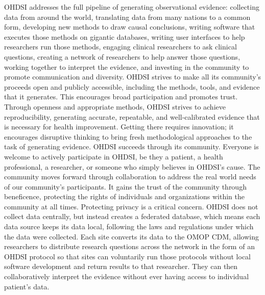 \documentclass[11pt]{book}
\theoremstyle{definition}
\theoremstyle{definition}
\theoremstyle{definition}
\theoremstyle{remark}
\begin{document}
OHDSI addresses the full pipeline of generating observational evidence: collecting data from around the world, translating data from many nations to a common form, developing new methods to draw causal conclusions, writing software that executes those methods on gigantic databases, writing user interfaces to help researchers run those methods, engaging clinical researchers to ask clinical questions, creating a network of researchers to help answer those questions, working together to interpret the evidence, and investing in the community to promote communication and diversity. OHDSI strives to make all its community's proceeds open and publicly accessible, including the methods, tools, and evidence that it generates. This encourages broad participation and promotes trust. Through openness and appropriate methods, OHDSI strives to achieve reproducibility, generating accurate, repeatable, and well-calibrated evidence that is necessary for health improvement. Getting there requires innovation; it encourages disruptive thinking to bring fresh methodological approaches to the task of generating evidence. OHDSI succeeds through its community. Everyone is welcome to actively participate in OHDSI, be they a patient, a health professional, a researcher, or someone who simply believes in OHDSI's cause. The community moves forward through collaboration to address the real world needs of our community's participants. It gains the trust of the community through beneficence, protecting the rights of individuals and organizations within the community at all times.
Protecting privacy is a critical concern. OHDSI does not collect data centrally, but instead creates a federated database, which means each data source keeps its data local, following the laws and regulations under which the data were collected. Each site converts its data to the OMOP CDM, allowing researchers to distribute research questions across the network in the form of an OHDSI protocol so that sites can voluntarily run those protocols without local software development and return results to that researcher. They can then collaboratively interpret the evidence without ever having access to individual patient's data.
\end{document}
